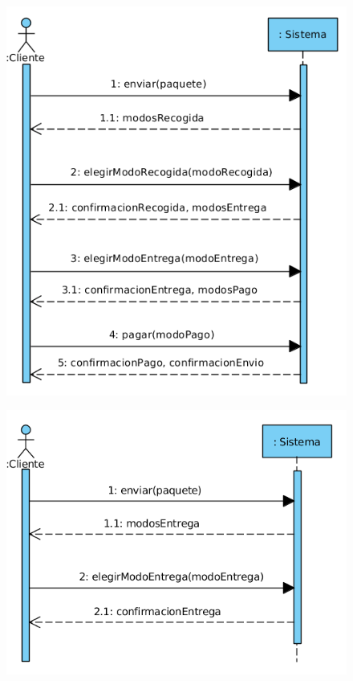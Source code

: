 \begin{figure}[H]
	\centering
	\includegraphics[width=16cm]{40}
\end{figure}
\begin{figure}[H]
	\centering
	\includegraphics[width=16cm]{41}
\end{figure}
